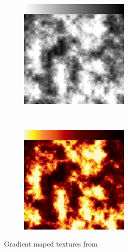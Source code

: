 \begin{figure}
\begin{subfigure}[b]{0.3\textwidth}
                \includegraphics[width=\textwidth]{img/Theory/Perlin_Noise/gradient_grey.png}
                \label{fig:Fbrocoli}
        \end{subfigure}
        ~ %
        \begin{subfigure}[b]{0.3\textwidth}
                \includegraphics[width=\textwidth]{img/Theory/Perlin_Noise/gradient_fire.png}
                \label{fig:Fbrocoli}
        \end{subfigure}
        \caption{Gradient maped textures from \cite{NoisesGAMES}}
        \label{fig:NTextures}
\end{figure}


